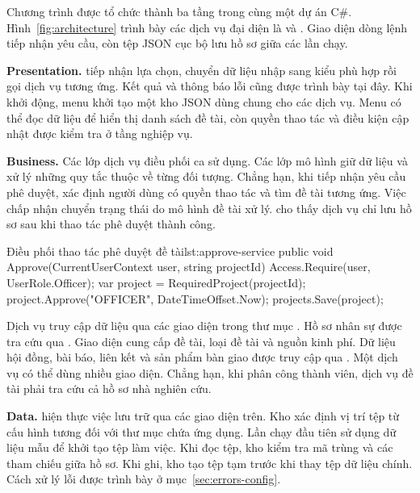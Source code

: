 Chương trình được tổ chức thành ba tầng trong cùng một dự án C\#. Hình~\ref{fig:architecture} trình bày các dịch vụ đại diện là  và . Giao diện dòng lệnh tiếp nhận yêu cầu, còn tệp JSON cục bộ lưu hồ sơ giữa các lần chạy.

\textbf{Presentation.}  tiếp nhận lựa chọn, chuyển dữ liệu nhập sang kiểu phù hợp rồi gọi dịch vụ tương ứng. Kết quả và thông báo lỗi cũng được trình bày tại đây. Khi khởi động, menu khởi tạo một kho JSON dùng chung cho các dịch vụ. Menu có thể đọc dữ liệu để hiển thị danh sách đề tài, còn quyền thao tác và điều kiện cập nhật được kiểm tra ở tầng nghiệp vụ.

\textbf{Business.} Các lớp dịch vụ điều phối ca sử dụng. Các lớp mô hình giữ dữ liệu và xử lý những quy tắc thuộc về từng đối tượng. Chẳng hạn, khi tiếp nhận yêu cầu phê duyệt,  xác định người dùng có quyền thao tác và tìm đề tài tương ứng. Việc chấp nhận chuyển trạng thái do mô hình đề tài xử lý.  cho thấy dịch vụ chỉ lưu hồ sơ sau khi thao tác phê duyệt thành công.

\begin{ReportCode}[firstnumber=34]{Điều phối thao tác phê duyệt đề tài}{lst:approve-service}
    public void Approve(CurrentUserContext user, string projectId)
    {
        Access.Require(user, UserRole.Officer);
        var project = RequiredProject(projectId);
        project.Approve("OFFICER", DateTimeOffset.Now);
        projects.Save(project);
    }
\end{ReportCode}


Dịch vụ truy cập dữ liệu qua các giao diện trong thư mục . Hồ sơ nhân sự được tra cứu qua . Giao diện  cung cấp đề tài, loại đề tài và nguồn kinh phí. Dữ liệu hội đồng, bài báo, liên kết và sản phẩm bàn giao được truy cập qua . Một dịch vụ có thể dùng nhiều giao diện. Chẳng hạn, khi phân công thành viên, dịch vụ đề tài phải tra cứu cả hồ sơ nhà nghiên cứu.

\textbf{Data.}  hiện thực việc lưu trữ qua các giao diện trên. Kho xác định vị trí tệp từ cấu hình tương đối với thư mục chứa ứng dụng. Lần chạy đầu tiên sử dụng dữ liệu mẫu để khởi tạo tệp làm việc. Khi đọc tệp, kho kiểm tra mã trùng và các tham chiếu giữa hồ sơ. Khi ghi, kho tạo tệp tạm trước khi thay tệp dữ liệu chính. Cách xử lý lỗi được trình bày ở mục~\ref{sec:errors-config}.

